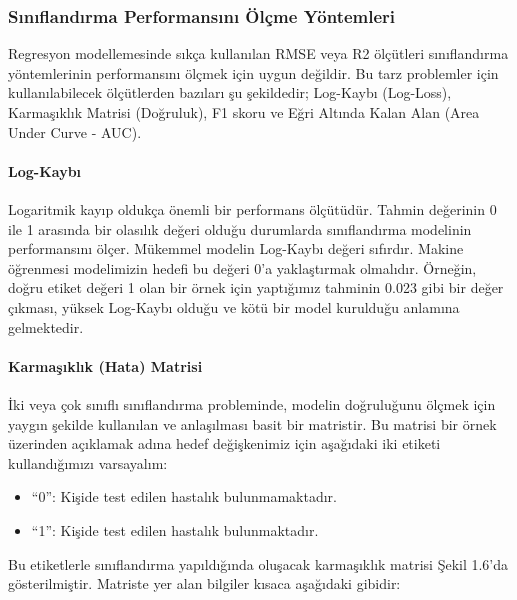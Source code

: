 \documentclass[12pt,twoside]{deuthesis}
\providecommand{\tightlist}{%
  \setlength{\itemsep}{0pt}\setlength{\parskip}{0pt}}
\begin{document}
\hypertarget{sux131nux131flandux131rma-performansux131nux131-uxf6luxe7me-yuxf6ntemleri}{%
\subsubsection{Sınıflandırma Performansını Ölçme Yöntemleri}\label{sux131nux131flandux131rma-performansux131nux131-uxf6luxe7me-yuxf6ntemleri}}

Regresyon modellemesinde sıkça kullanılan RMSE veya R2 ölçütleri sınıflandırma yöntemlerinin performansını ölçmek için uygun değildir. Bu tarz problemler için kullanılabilecek ölçütlerden bazıları şu şekildedir; Log-Kaybı (Log-Loss), Karmaşıklık Matrisi (Doğruluk), F1 skoru ve Eğri Altında Kalan Alan (Area Under Curve - AUC).

\hypertarget{log-kaybux131}{%
\paragraph{Log-Kaybı}\label{log-kaybux131}}

Logaritmik kayıp oldukça önemli bir performans ölçütüdür. Tahmin değerinin 0 ile 1 arasında bir olasılık değeri olduğu durumlarda sınıflandırma modelinin performansını ölçer. Mükemmel modelin Log-Kaybı değeri sıfırdır. Makine öğrenmesi modelimizin hedefi bu değeri 0'a yaklaştırmak olmalıdır. Örneğin, doğru etiket değeri 1 olan bir örnek için yaptığımız tahminin 0.023 gibi bir değer çıkması, yüksek Log-Kaybı olduğu ve kötü bir model kurulduğu anlamına gelmektedir.

\hypertarget{karmaux15fux131klux131k-hata-matrisi}{%
\paragraph{Karmaşıklık (Hata) Matrisi}\label{karmaux15fux131klux131k-hata-matrisi}}

İki veya çok sınıflı sınıflandırma probleminde, modelin doğruluğunu ölçmek için yaygın şekilde kullanılan ve anlaşılması basit bir matristir. Bu matrisi bir örnek üzerinden açıklamak adına hedef değişkenimiz için aşağıdaki iki etiketi kullandığımızı varsayalım:
\begin{itemize}
\tightlist
\item
  ``0'': Kişide test edilen hastalık bulunmamaktadır.
\item
  ``1'': Kişide test edilen hastalık bulunmaktadır.
\end{itemize}
Bu etiketlerle sınıflandırma yapıldığında oluşacak karmaşıklık matrisi Şekil 1.6'da gösterilmiştir. Matriste yer alan bilgiler kısaca aşağıdaki gibidir:
\end{document}
